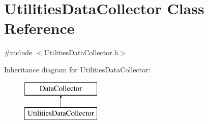 \hypertarget{classUtilitiesDataCollector}{}\section{Utilities\+Data\+Collector Class Reference}
\label{classUtilitiesDataCollector}


{\ttfamily \#include $<$Utilities\+Data\+Collector.\+h$>$}

Inheritance diagram for Utilities\+Data\+Collector\+:\begin{figure}[H]
\begin{center}
\leavevmode
\includegraphics[height=2.000000cm]{classUtilitiesDataCollector}
\end{center}
\end{figure}
